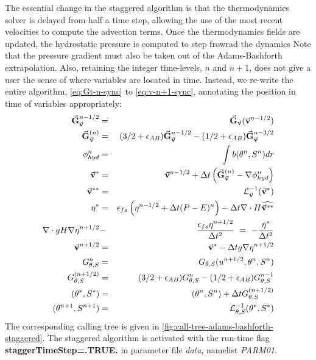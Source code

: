 The essential change in the staggered algorithm is that the 
thermodynamics solver is delayed from half a time step, 
allowing the use of the most recent velocities to compute 
the advection terms. Once the thermodynamics fields are
updated, the hydrostatic pressure is computed 
to step frowrad the dynamics
Note that the pressure gradient must also be taken out of the
Adams-Bashforth extrapolation. Also, retaining the integer time-levels,
$n$ and $n+1$, does not give a user the sense of where variables are
located in time.  Instead, we re-write the entire algorithm,
\ref{eq:Gt-n-sync} to \ref{eq:v-n+1-sync}, annotating the
position in time of variables appropriately:
\begin{eqnarray}
\vec{\bf G}_{\vec{\bf v}}^{n-1/2} & = & \vec{\bf G}_{\vec{\bf v}} ( \vec{\bf v}^{n-1/2} )
\label{eq:Gv-n-staggered} \\
\vec{\bf G}_{\vec{\bf v}}^{(n)} & = & (3/2 + \epsilon_{AB} ) \vec{\bf G}_{\vec{\bf v}}^{n-1/2} - (1/2 + \epsilon_{AB} ) \vec{\bf G}_{\vec{\bf v}}^{n-3/2}
\label{eq:Gv-n+5-staggered} \\
\phi^{n}_{hyd} & = & \int b(\theta^{n},S^{n}) dr
\label{eq:phi-hyd-staggered} \\
\vec{\bf v}^{*} & = & \vec{\bf v}^{n-1/2} + \Delta t \left( \vec{\bf G}_{\vec{\bf v}}^{(n)} - \nabla \phi_{hyd}^{n} \right)
\label{eq:vstar-staggered} \\
\vec{\bf v}^{**} & = & {\cal L}_{\vec{\bf v}}^{-1} ( \vec{\bf v}^* )
\label{eq:vstarstar-staggered} \\
\eta^* & = & \epsilon_{fs} \left( \eta^{n-1/2} + \Delta t (P-E)^n \right)- \Delta t 
  \nabla \cdot H \widehat{ \vec{\bf v}^{**} }
\label{eq:nstar-staggered} \\
\nabla \cdot g H \nabla \eta^{n+1/2} & - & \frac{\epsilon_{fs} \eta^{n+1/2}}{\Delta t^2}
~ = ~ - \frac{\eta^*}{\Delta t^2}
\label{eq:elliptic-staggered} \\
\vec{\bf v}^{n+1/2} & = & \vec{\bf v}^{*} - \Delta t g \nabla \eta^{n+1/2}
\label{eq:v-n+1-staggered} \\
G_{\theta,S}^{n} & = & G_{\theta,S} ( u^{n+1/2}, \theta^{n}, S^{n} )
\label{eq:Gt-n-staggered} \\
G_{\theta,S}^{(n+1/2)} & = & (3/2+\epsilon_{AB}) G_{\theta,S}^{n}-(1/2+\epsilon_{AB}) G_{\theta,S}^{n-1}
\label{eq:Gt-n+5-staggered} \\
(\theta^*,S^*) & = & (\theta^{n},S^{n}) + \Delta t G_{\theta,S}^{(n+1/2)}
\label{eq:tstar-staggered} \\
(\theta^{n+1},S^{n+1}) & = & {\cal L}^{-1}_{\theta,S} (\theta^*,S^*)
\label{eq:t-n+1-staggered} \\
\end{eqnarray}
The corresponding calling tree is given in
\ref{fig:call-tree-adams-bashforth-staggered}.
The staggered algorithm is activated with the run-time flag 
{\bf staggerTimeStep=.TRUE.} in parameter file {\em data},
namelist {\em PARM01}.

